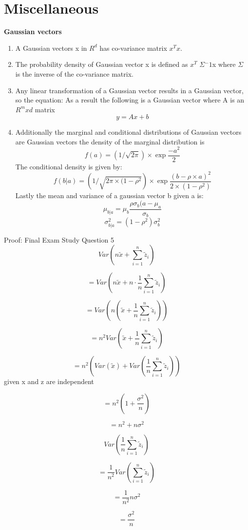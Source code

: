 \documentclass[12pt,twoside]{article}
\begin{document}
\section*{Miscellaneous}
\textbf{Gaussian vectors}
\begin{enumerate}
    \item A Gaussian vectors x in ${R^d}$ has co-variance matrix ${x^Tx}$. 
    \item The probability density of Gaussian vector x is defined as ${x^T}$ $\Sigma{^-1}$x where $\Sigma$ is the inverse of the co-variance matrix.
    \item Any linear transformation of a Gaussian vector results in a Gaussian vector, so the equation:
    \subitem As a result the following is a Gaussian vector where A is an ${R^mxd}$ matrix
        \begin{equation}
             y = Ax + b 
        \end{equation}
    \item Additionally the marginal and conditional distributions of Gaussian vectors are Gaussian vectors
    \subitem the density of the marginal distribution is 
       \begin{equation}
             f(a) = (1/\sqrt{2\pi}) \times \exp{\frac{-a^2}{2}}
        \end{equation}
    \subitem The conditional density is given by:
      \begin{equation}
             f(b|a) = (1/\sqrt{2\pi\times(1-\rho^2}) \times \exp{\frac{(b-\rho\times a)^2}{2\times(1-\rho^2)}}
        \end{equation}
    \subitem Lastly the mean and variance of a gaussian vector b given a is:
        \begin{equation}
            \mu_{b|a} = \mu_b \frac{\rho\sigma_b(a-\mu_a}{\sigma_b}
        \end{equation}
        \begin{equation}
             \sigma^2_{b|a} = (1-\rho^2)\sigma^2_b
        \end{equation}

\end{enumerate}

Proof: Final Exam Study Question 5
$$Var(n\tilde{x}+\sum_{i=1}^{n}\tilde{z}_{i})$$

$$= Var(n\tilde{x} +n\cdot \frac{1}{n}\sum_{i=1}^{n}\tilde{z}_{i})$$

$$= Var(n(\tilde{x} +\frac{1}{n}\sum_{i=1}^{n}\tilde{z}_{i}))$$

$$ = n^{2} Var(\tilde{x} +\frac{1}{n}\sum_{i=1}^{n}\tilde{z}_{i})$$

$$= n^{2} (Var(\tilde{x}) + Var(\frac{1}{n}\sum_{i=1}^{n}\tilde{z}_{i}))$$  given x and z are independent

$$= n^{2} (1+\frac{\sigma ^{2}}{n})$$

$$= n^{2} +n{\sigma ^{2}}$$




$$Var(\frac{1}{n}\sum_{i=1}^{n}\tilde{z}_{i})$$

$$=\frac{1}{n^{2}}Var(\sum_{i=1}^{n}\tilde{z}_{i})$$

$$=\frac{1}{n^{2}}n\sigma ^{2}$$

$$=\frac{\sigma ^{2}}{n}$$
\end{document}
